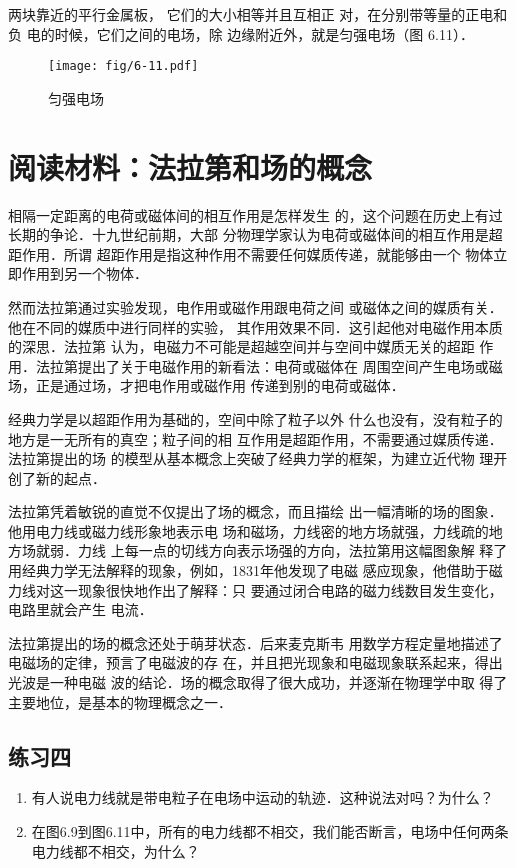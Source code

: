 两块靠近的平行金属板，
它们的大小相等并且互相正
对，在分别带等量的正电和负
电的时候，它们之间的电场，除
边缘附近外，就是匀强电场（图
6.11）．

\begin{figure}[htp]\centering
\texttt{[image: fig/6-11.pdf]}
\caption{匀强电场}
\end{figure}

\section*{阅读材料：法拉第和场的概念}
相隔一定距离的电荷或磁体间的相互作用是怎样发生
的，这个问题在历史上有过长期的争论．十九世纪前期，大部
分物理学家认为电荷或磁体间的相互作用是超距作用．所谓
超距作用是指这种作用不需要任何媒质传递，就能够由一个
物体立即作用到另一个物体．

然而法拉第通过实验发现，电作用或磁作用跟电荷之间
或磁体之间的媒质有关．他在不同的媒质中进行同样的实验，
其作用效果不同．这引起他对电磁作用本质的深思．法拉第
认为，电磁力不可能是超越空间并与空间中媒质无关的超距
作用．法拉第提出了关于电磁作用的新看法：电荷或磁体在
周围空间产生电场或磁场，正是通过场，才把电作用或磁作用
传递到别的电荷或磁体．

经典力学是以超距作用为基础的，空间中除了粒子以外
什么也没有，没有粒子的地方是一无所有的真空；粒子间的相
互作用是超距作用，不需要通过媒质传递．法拉第提出的场
的模型从基本概念上突破了经典力学的框架，为建立近代物
理开创了新的起点．

法拉第凭着敏锐的直觉不仅提出了场的概念，而且描绘
出一幅清晰的场的图象．他用电力线或磁力线形象地表示电
场和磁场，力线密的地方场就强，力线疏的地方场就弱．力线
上每一点的切线方向表示场强的方向，法拉第用这幅图象解
释了用经典力学无法解释的现象，例如，1831年他发现了电磁
感应现象，他借助于磁力线对这一现象很快地作出了解释：只
要通过闭合电路的磁力线数目发生变化，电路里就会产生
电流．

法拉第提出的场的概念还处于萌芽状态．后来麦克斯韦
用数学方程定量地描述了电磁场的定律，预言了电磁波的存
在，并且把光现象和电磁现象联系起来，得出光波是一种电磁
波的结论．场的概念取得了很大成功，并逐渐在物理学中取
得了主要地位，是基本的物理概念之一．

\subsection*{练习四}

\begin{enumerate}
	\item 有人说电力线就是带电粒子在电场中运动的轨迹．这种说法对吗？为什么？
	\item 在图6.9到图6.11中，所有的电力线都不相交，我们能否断言，电场中任何两条电力线都不相交，为什么？
\end{enumerate}

